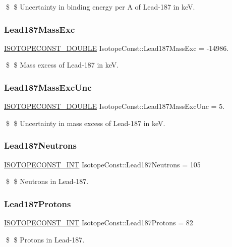 \$ \$ Uncertainty in binding energy per A of Lead-\/187 in keV. \mbox{\label{group___isotope_const-_lead-_pb187_gabf8e1d6e6263458965f95f3e73d5b227}} 
\subsubsection{\texorpdfstring{Lead187\+Mass\+Exc}{Lead187MassExc}}
{\footnotesize\ttfamily \mbox{\hyperlink{group___isotope_const-_macros_ga8f45a7272ce02c0b4c65c44636ed719a}{I\+S\+O\+T\+O\+P\+E\+C\+O\+N\+S\+T\+\_\+\+D\+O\+U\+B\+LE}} Isotope\+Const\+::\+Lead187\+Mass\+Exc = -\/14986.}

\$ \$ Mass excess of Lead-\/187 in keV. \mbox{\label{group___isotope_const-_lead-_pb187_ga0cda1bd37a7fc33bf4c4a95b6c6c3fde}} 
\subsubsection{\texorpdfstring{Lead187\+Mass\+Exc\+Unc}{Lead187MassExcUnc}}
{\footnotesize\ttfamily \mbox{\hyperlink{group___isotope_const-_macros_ga8f45a7272ce02c0b4c65c44636ed719a}{I\+S\+O\+T\+O\+P\+E\+C\+O\+N\+S\+T\+\_\+\+D\+O\+U\+B\+LE}} Isotope\+Const\+::\+Lead187\+Mass\+Exc\+Unc = 5.}

\$ \$ Uncertainty in mass excess of Lead-\/187 in keV. \mbox{\label{group___isotope_const-_lead-_pb187_ga37a05596986bda8196fc7f7a47ea8fa6}} 
\subsubsection{\texorpdfstring{Lead187\+Neutrons}{Lead187Neutrons}}
{\footnotesize\ttfamily \mbox{\hyperlink{group___isotope_const-_macros_ga5f18360b3e99483a35c32d789e62621c}{I\+S\+O\+T\+O\+P\+E\+C\+O\+N\+S\+T\+\_\+\+I\+NT}} Isotope\+Const\+::\+Lead187\+Neutrons = 105}

\$ \$ Neutrons in Lead-\/187. \mbox{\label{group___isotope_const-_lead-_pb187_gac03dbfb22983694794d84b33ce7811a2}} 
\subsubsection{\texorpdfstring{Lead187\+Protons}{Lead187Protons}}
{\footnotesize\ttfamily \mbox{\hyperlink{group___isotope_const-_macros_ga5f18360b3e99483a35c32d789e62621c}{I\+S\+O\+T\+O\+P\+E\+C\+O\+N\+S\+T\+\_\+\+I\+NT}} Isotope\+Const\+::\+Lead187\+Protons = 82}

\$ \$ Protons in Lead-\/187. 